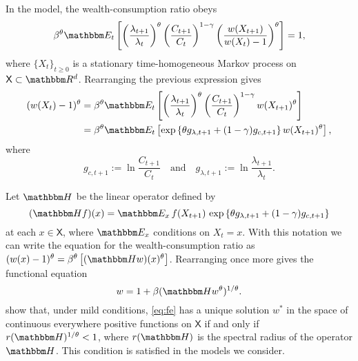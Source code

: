 \documentclass[12pt, reqno]{amsart}
\renewcommand{\geq}{\geqslant}
\newcommand{\1}{\mathbbm 1}
\newcommand{\RR}{\mathbbm R}
\newcommand{\HH}{\mathbbm H}
\newcommand{\EE}{\mathbbm E}
\newcommand{\XX}{\mathsf X}
\theoremstyle{plain}
\theoremstyle{definition}
\begin{document}
In the model, the wealth-consumption ratio obeys
%
\begin{equation*}
    \beta^{\theta}
    \EE_t
    \left[
    \left( \frac{\lambda_{t+1}}{\lambda_t} \right)^\theta
        \left( \frac{C_{t+1}}{C_t} \right)^{1-\gamma}
        \left( \frac{w(X_{t+1})}{w(X_t)-1} \right)^\theta
    \right] = 1,
\end{equation*}
%
where $\{ X_t \}_{t \geq 0}$ is a stationary time-homogeneous Markov process on
$\XX \subset \RR^d$.
Rearranging the previous expression gives
%
\begin{align*}
    (w(X_t)-1)^\theta
    & = \beta^{\theta}
    \EE_t
    \left[
    \left( \frac{\lambda_{t+1}}{\lambda_t} \right)^\theta
        \left( \frac{C_{t+1}}{C_t} \right)^{1-\gamma}
        w(X_{t+1})^\theta
    \right]
    \\
    & = \beta^{\theta}
    \EE_t
    \left[
        \exp
        \left\{ 
            \theta g_{\lambda, t+1} + (1-\gamma) g_{c, t+1}
        \right\}
        w(X_{t+1})^\theta
    \right],
\end{align*}
%
where
%
\begin{equation}
    \label{eq:kappa}
    g_{c, t+1}
    := \ln \frac{C_{t+1}}{C_t}
    \quad \text{and} \quad
    g_{\lambda, t+1}
    := \ln \frac{\lambda_{t+1}}{\lambda_t}.
\end{equation}
%

Let $\HH$ be the linear operator defined by
%
\begin{equation}\label{eq:defk}
    (\HH f)(x) = \EE_x 
        \, f(X_{t+1})  \,
        \exp
        \left\{ 
            \theta g_{\lambda, t+1} + (1-\gamma) g_{c, t+1}
        \right\}
\end{equation}
%
at each $x \in \XX$,  where $\EE_x$ conditions on $X_t = x$.  With this notation
we can write the equation for the wealth-consumption ratio as
    $(w(x)-1)^\theta
    = \beta^{\theta}
    \left[
        (\HH w)(x)^\theta
    \right]$.
Rearranging once more gives the functional equation
%
\begin{equation}\label{eq:fe}
    w = 1 + \beta ( \HH w^\theta )^{1/\theta}.
\end{equation}
%
\cite{stachurski2022unique} show that, under mild conditions, \eqref{eq:fe} has
a unique solution $w^*$ in the space of continuous everywhere positive functions
on $\XX$ if and only if $r(\HH)^{1/\theta} < 1$, where $r(\HH)$ is the spectral radius
of the operator $\HH$.  This condition is satisfied in the models we consider.
\end{document}
